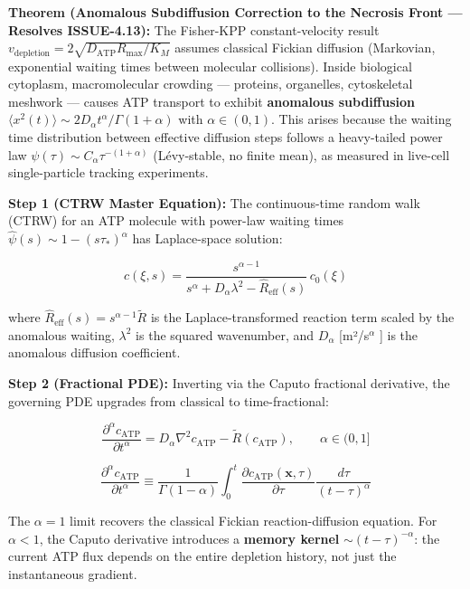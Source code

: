 \documentclass[11pt,a4paper]{article}
\theoremstyle{definition}
\theoremstyle{remark}
\begin{document}
\textbf{Theorem (Anomalous Subdiffusion Correction to the Necrosis Front — Resolves ISSUE-4.13):} The Fisher-KPP constant-velocity result $v_{\text{depletion}} = 2\sqrt{D_{\text{ATP}}R_{\max}/K_M}$ assumes classical Fickian diffusion (Markovian, exponential waiting times between molecular collisions). Inside biological cytoplasm, macromolecular crowding — proteins, organelles, cytoskeletal meshwork — causes ATP transport to exhibit \textbf{anomalous subdiffusion} $\langle x^2(t) \rangle \sim 2D_\alpha t^\alpha / \Gamma(1+\alpha)$ with $\alpha \in (0,1)$. This arises because the waiting time distribution between effective diffusion steps follows a heavy-tailed power law $\psi(\tau) \sim C_\alpha \tau^{-(1+\alpha)}$ (Lévy-stable, no finite mean), as measured in live-cell single-particle tracking experiments.

\textbf{Step 1 (CTRW Master Equation):} The continuous-time random walk (CTRW) for an ATP molecule with power-law waiting times $\hat{\psi}(s) \sim 1 - (s\tau_*)^\alpha$ has Laplace-space solution:


\begin{equation}
\hat{c}(\xi, s) = \frac{s^{\alpha - 1}}{s^\alpha + D_\alpha \lambda^2 - \hat{R}_{\text{eff}}(s)} \, c_0(\xi)
\end{equation}


where $\hat{R}_{\text{eff}}(s) = s^{\alpha-1}\tilde{R}$ is the Laplace-transformed reaction term scaled by the anomalous waiting, $\lambda^2$ is the squared wavenumber, and $D_\alpha$ [m²/s$^\alpha$ ] is the anomalous diffusion coefficient.

\textbf{Step 2 (Fractional PDE):} Inverting via the Caputo fractional derivative, the governing PDE upgrades from classical to time-fractional:


\begin{equation}
\boxed{\frac{\partial^\alpha c_{\text{ATP}}}{\partial t^\alpha} = D_\alpha \nabla^2 c_{\text{ATP}} - \tilde{R}(c_{\text{ATP}}), \qquad \alpha \in (0, 1]}
\end{equation}



\begin{equation}
\frac{\partial^\alpha c_{\text{ATP}}}{\partial t^\alpha} \equiv \frac{1}{\Gamma(1-\alpha)} \int_0^t \frac{\partial c_{\text{ATP}}(\mathbf{x}, \tau)}{\partial \tau} \frac{d\tau}{(t - \tau)^\alpha}
\end{equation}


The $\alpha = 1$ limit recovers the classical Fickian reaction-diffusion equation. For $\alpha < 1$, the Caputo derivative introduces a \textbf{memory kernel} $\sim (t-\tau)^{-\alpha}$: the current ATP flux depends on the entire depletion history, not just the instantaneous gradient.
\end{document}
